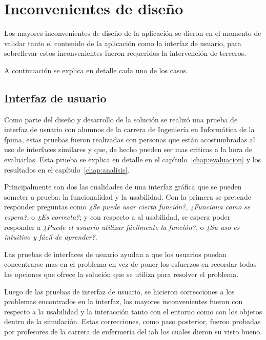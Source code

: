 \section{Inconvenientes de diseño}

Los mayores inconvenientes de diseño de la aplicación se dieron en el momento de
validar tanto el contenido de la aplicación como la interfaz de usuario, para
sobrellevar estos inconvenientes fueron requeridos la intervención de terceros.

A continuación se explica en detalle cada uno de los casos.

\subsection{Interfaz de usuario}

Como parte del diseño y desarrollo de la solución se realizó una prueba de
interfaz de usuario con alumnos de la carrera de Ingeniería en Informática de la
\Gls{fpuna}, estas pruebas fueron realizadas con personas que están
acostumbradas al uso de interfaces similares y que, de hecho pueden ser mas
criticas a la hora de evaluarlas. Esta prueba se explica en detalle en el
capítulo~\ref{chap:evaluacion} y los resultados en el
capítulo~\ref{chap:analisis}.

Principalmente son dos las cualidades de una interfaz gráfica que se pueden
someter a prueba: la funcionalidad y la usabilidad. Con la primera se pretende
responder preguntas como \textit{¿Se puede usar cierta función?},
\textit{¿Funciona como se espera?}, o \textit{¿Es correcta?}; y con respecto a
al usabilidad, se espera poder responder a \textit{¿Puede el usuario
    utilizar fácilmente la función?}, o \textit{¿Su uso es intuitivo y fácil de
    aprender?}\cite{fragaverificacion}.

Las pruebas de interfaces de usuario ayudan a que los usuarios puedan
concentrarse mas en el problema en vez de poner los esfuerzos en recordar todas
las opciones que ofrece la solución que se utiliza para resolver el
problema\cite{horowitz1993graphical}.

Luego de las pruebas de interfaz de usuario, se hicieron correcciones a los
problemas encontrados en la interfaz, los mayores inconvenientes fueron con
respecto a la usabilidad y la interacción tanto con el entorno como con los
objetos dentro de la simulación. Estas correcciones, como paso posterior, fueron
probadas por profesores de la carrera de enfermería del \Gls{iab} los cuales
dieron su visto bueno.

